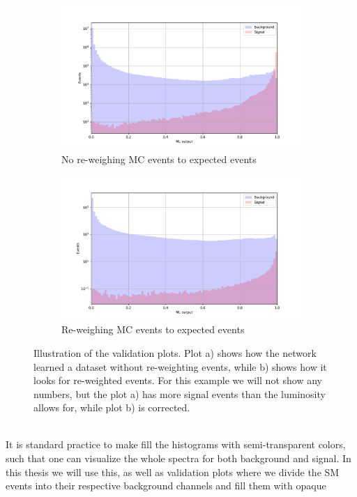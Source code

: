 \documentclass[12pt, a4paper]{book}
\begin{document}
\begin{figure}[!ht]
	\centering
    \begin{subfigure}[b]{0.7\textwidth}
        \centering
        \includegraphics[width=\textwidth]{VAL_unscaled.pdf}
        \caption{No re-weighing MC events to expected events}
    \end{subfigure}
    \hfill
    \begin{subfigure}[b]{0.7\textwidth}
        \centering
        \includegraphics[width=\textwidth]{VAL.pdf}
        \caption{Re-weighing MC events to expected events}
    \end{subfigure}
    \caption[Validation plots illustration]{Illustration of the validation plots. Plot a) shows how the network learned a dataset without re-weighting events, while b) shows how it looks for re-weighted events. For this example we will not show any numbers, but the plot a) has more signal events than the luminosity allows for, while plot b) is corrected.}\label{fig:VAL}
\end{figure}
\\It is standard practice to make fill the histograms with semi-transparent colors, such that one can visualize the whole spectra for both background and signal. In this thesis we will use this, as well as validation plots where we divide the SM events into their respective background channels and fill them with opaque 
\end{document}
